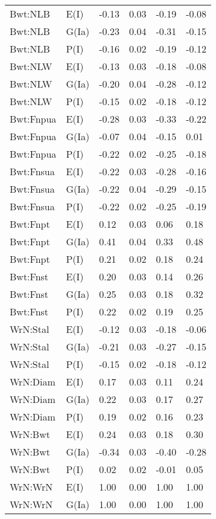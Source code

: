 \begin{center}
\begin{longtable}{|p{1.1in}|p{0.7in}|p{0.7in}|p{0.6in}|p{0.6in}|p{0.6in}|}
  Bwt:NLB & E(I) & -0.13 & 0.03 & -0.19 & -0.08 \\ 
  Bwt:NLB & G(Ia) & -0.23 & 0.04 & -0.31 & -0.15 \\ 
  Bwt:NLB & P(I) & -0.16 & 0.02 & -0.19 & -0.12 \\ 
  Bwt:NLW & E(I) & -0.13 & 0.03 & -0.18 & -0.08 \\ 
  Bwt:NLW & G(Ia) & -0.20 & 0.04 & -0.28 & -0.12 \\ 
  Bwt:NLW & P(I) & -0.15 & 0.02 & -0.18 & -0.12 \\ 
  Bwt:Fnpua & E(I) & -0.28 & 0.03 & -0.33 & -0.22 \\ 
  Bwt:Fnpua & G(Ia) & -0.07 & 0.04 & -0.15 & 0.01 \\ 
  Bwt:Fnpua & P(I) & -0.22 & 0.02 & -0.25 & -0.18 \\ 
  Bwt:Fnsua & E(I) & -0.22 & 0.03 & -0.28 & -0.16 \\ 
  Bwt:Fnsua & G(Ia) & -0.22 & 0.04 & -0.29 & -0.15 \\ 
  Bwt:Fnsua & P(I) & -0.22 & 0.02 & -0.25 & -0.19 \\ 
  Bwt:Fnpt & E(I) & 0.12 & 0.03 & 0.06 & 0.18 \\ 
  Bwt:Fnpt & G(Ia) & 0.41 & 0.04 & 0.33 & 0.48 \\ 
  Bwt:Fnpt & P(I) & 0.21 & 0.02 & 0.18 & 0.24 \\ 
  Bwt:Fnst & E(I) & 0.20 & 0.03 & 0.14 & 0.26 \\ 
  Bwt:Fnst & G(Ia) & 0.25 & 0.03 & 0.18 & 0.32 \\ 
  Bwt:Fnst & P(I) & 0.22 & 0.02 & 0.19 & 0.25 \\ 
  WrN:Stal & E(I) & -0.12 & 0.03 & -0.18 & -0.06 \\ 
  WrN:Stal & G(Ia) & -0.21 & 0.03 & -0.27 & -0.15 \\ 
  WrN:Stal & P(I) & -0.15 & 0.02 & -0.18 & -0.12 \\ 
  WrN:Diam & E(I) & 0.17 & 0.03 & 0.11 & 0.24 \\ 
  WrN:Diam & G(Ia) & 0.22 & 0.03 & 0.17 & 0.27 \\ 
  WrN:Diam & P(I) & 0.19 & 0.02 & 0.16 & 0.23 \\ 
  WrN:Bwt & E(I) & 0.24 & 0.03 & 0.18 & 0.30 \\ 
  WrN:Bwt & G(Ia) & -0.34 & 0.03 & -0.40 & -0.28 \\ 
  WrN:Bwt & P(I) & 0.02 & 0.02 & -0.01 & 0.05 \\ 
  WrN:WrN & E(I) & 1.00 & 0.00 & 1.00 & 1.00 \\ 
  WrN:WrN & G(Ia) & 1.00 & 0.00 & 1.00 & 1.00 \\ 

\end{longtable}
\end{center}
